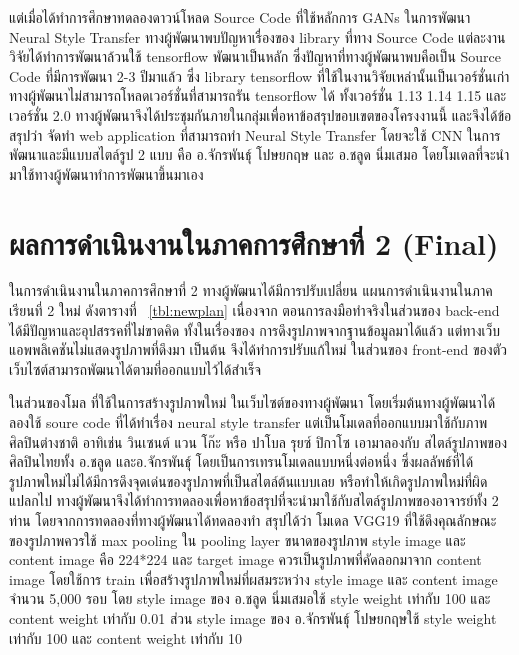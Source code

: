\documentclass[12pt,oneside,openright,a4paper]{cpe-thai-project}
\begin{document}
\par\setlength{\parindent}{5ex}
แต่เมื่อได้ทำการศึกษาทดลองดาวน์โหลด Source Code ที่ใช้หลักการ GANs ในการพัฒนา Neural Style Transfer ทางผู้พัฒนาพบปัญหาเรื่องของ library ที่ทาง Source  Code แต่ละงานวิจัยได้ทำการพัฒนาล้วนใช้ tensorflow พัฒนาเป็นหลัก ซึ่งปัญหาที่ทางผู้พัฒนาพบคือเป็น Source Code ที่มีการพัฒนา 2-3 ปีมาแล้ว ซึ่ง library tensorflow ที่ใช้ในงานวิจัยเหล่านั้นเป็นเวอร์ชั่นเก่า ทางผู้พัฒนาไม่สามารถโหลดเวอร์ชั่นที่สามารถรัน tensorflow ได้ ทั้งเวอร์ชั่น 1.13 1.14 1.15 และเวอร์ชั่น 2.0 ทางผู้พัฒนาจึงได้ประชุมกันภายในกลุ่มเพื่อหาข้อสรุปขอบเขตของโครงงานนี้ และจึงได้ข้อสรุปว่า จัดทำ web application ที่สามารถทำ Neural Style Transfer โดยจะใช้ CNN ในการพัฒนาและมีแบบสไตล์รูป 2 แบบ คือ อ.จักรพันธุ์ โปษยกฤษ และ อ.ชลูด นิ่มเสมอ โดยโมเดลที่จะนำมาใช้ทางผู้พัฒนาทำการพัฒนาขึ้นมาเอง

\section{ผลการดำเนินงานในภาคการศึกษาที่ 2 (Final) }
\par\setlength{\parindent}{5ex}
ในการดำเนินงานในภาคการศึกษาที่ 2 ทางผู้พัฒนาได้มีการปรับเปลี่ยน แผนการดำเนินงานในภาคเรียนที่ 2 ใหม่ ดังตารางที่ ~\ref{tbl:newplan} เนื่องจาก ตอนการลงมือทำจริงในส่วนของ back-end ได้มีปัญหาและอุปสรรคที่ไม่ขาดคิด ทั้งในเรื่องของ การดึงรูปภาพจากฐานข้อมูลมาได้แล้ว แต่ทางเว็บแอพพลิเคชันไม่แสดงรูปภาพที่ดึงมา เป็นต้น   จึงได้ทำการปรับแก้ใหม่ ในส่วนของ front-end ของตัวเว็บไซต์สามารถพัฒนาได้ตามที่ออกแบบไว้ได้สำเร็จ 
\par\setlength{\parindent}{5ex}
ในส่วนของโมล ที่ใช้ในการสร้างรูปภาพใหม่ ในเว็บไซต์ของทางผู้พัฒนา  โดยเริ่มต้นทางผู้พัฒนาได้ลองใช้ soure code ที่ได้ทำเรื่อง neural style transfer แต่เป็นโมเดลที่ออกแบบมาใช้กับภาพศิลปินต่างชาติ อาทิเช่น วินเซนต์ แวน โก๊ะ หรือ ปาโบล รุยซ์ ปิกาโซ เอามาลองกับ สไตล์รูปภาพของศิลปินไทยทั้ง อ.ชลูด และอ.จักรพันธุ์ โดยเป็นการเทรนโมเดลแบบหนึ่งต่อหนึ่ง ซึ่งผลลัพธ์ที่ได้ รูปภาพใหม่ไม่ได้มีการดึงจุดเด่นของรูปภาพที่เป็นสไตล์ต้นแบบเลย หรือทำให้เกิดรูปภาพใหม่ที่ผิดแปลกไป ทางผู้พัฒนาจึงได้ทำการทดลองเพื่อหาข้อสรุปที่จะนำมาใช้กับสไตล์รูปภาพของอาจารย์ทั้ง 2 ท่าน โดยจากการทดลองที่ทางผู้พัฒนาได้ทดลองทำ สรุปได้ว่า โมเดล VGG19 ที่ใช้ดึงคุณลักษณะของรูปภาพควรใช้ max pooling ใน pooling layer ขนาดของรูปภาพ style image และ content image คือ 224*224 และ target image ควรเป็นรูปภาพที่คัดลอกมาจาก content image โดยใช้การ train เพื่อสร้างรูปภาพใหม่ที่ผสมระหว่าง style image และ content image จำนวน 5,000 รอบ โดย style image ของ อ.ชลูด นิ่มเสมอใช้ style weight เท่ากับ 100 และ content weight เท่ากับ 0.01 ส่วน style image ของ อ.จักรพันธุ์ โปษยกฤษใช้  style weight เท่ากับ 100 และ content weight เท่ากับ 10
\end{document}
